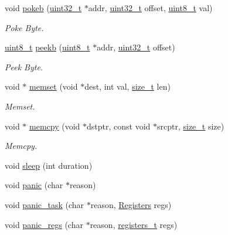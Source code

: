 \begin{DoxyCompactItemize}
\item 
void \hyperlink{a00119_aa291c9926b84df379482632e80ec7c47_aa291c9926b84df379482632e80ec7c47}{pokeb} (\hyperlink{a00125_a435d1572bf3f880d55459d9805097f62_a435d1572bf3f880d55459d9805097f62}{uint32\+\_\+t} $\ast$addr, \hyperlink{a00125_a435d1572bf3f880d55459d9805097f62_a435d1572bf3f880d55459d9805097f62}{uint32\+\_\+t} offset, \hyperlink{a00125_aba7bc1797add20fe3efdf37ced1182c5_aba7bc1797add20fe3efdf37ced1182c5}{uint8\+\_\+t} val)
\begin{DoxyCompactList}\small\item\em Poke Byte. \end{DoxyCompactList}\item 
\hyperlink{a00125_aba7bc1797add20fe3efdf37ced1182c5_aba7bc1797add20fe3efdf37ced1182c5}{uint8\+\_\+t} \hyperlink{a00119_a353956c1fd65c7ed787836534fc9354e_a353956c1fd65c7ed787836534fc9354e}{peekb} (\hyperlink{a00125_aba7bc1797add20fe3efdf37ced1182c5_aba7bc1797add20fe3efdf37ced1182c5}{uint8\+\_\+t} $\ast$addr, \hyperlink{a00125_a435d1572bf3f880d55459d9805097f62_a435d1572bf3f880d55459d9805097f62}{uint32\+\_\+t} offset)
\begin{DoxyCompactList}\small\item\em Peek Byte. \end{DoxyCompactList}\item 
void $\ast$ \hyperlink{a00119_a9e432f267691eceb2e2e0efcc37efbc9_a9e432f267691eceb2e2e0efcc37efbc9}{memset} (void $\ast$dest, int val, \hyperlink{a00125_a29d85914ddff32967d85ada69854206d_a29d85914ddff32967d85ada69854206d}{size\+\_\+t} len)
\begin{DoxyCompactList}\small\item\em Memset. \end{DoxyCompactList}\item 
void $\ast$ \hyperlink{a00119_a370712322c794e949c996946f2283ea8_a370712322c794e949c996946f2283ea8}{memcpy} (void $\ast$dstptr, const void $\ast$srcptr, \hyperlink{a00125_a29d85914ddff32967d85ada69854206d_a29d85914ddff32967d85ada69854206d}{size\+\_\+t} size)
\begin{DoxyCompactList}\small\item\em Memcpy. \end{DoxyCompactList}\item 
void \hyperlink{a00119_afcc76b3d055f3137e37a9c1ce82d0b95_afcc76b3d055f3137e37a9c1ce82d0b95}{sleep} (int duration)
\item 
void \hyperlink{a00119_a5919f9070dd900fd46009a12ce50c2f2_a5919f9070dd900fd46009a12ce50c2f2}{panic} (char $\ast$reason)
\item 
void \hyperlink{a00119_ab8a927fdcddb96915c7f185e2a5db4da_ab8a927fdcddb96915c7f185e2a5db4da}{panic\+\_\+task} (char $\ast$reason, \hyperlink{a00234}{Registers} regs)
\item 
void \hyperlink{a00119_a3f921f0652e48eb9693a597e546081af_a3f921f0652e48eb9693a597e546081af}{panic\+\_\+regs} (char $\ast$reason, \hyperlink{a00104_adf58dbaf6139b4957c348711f2026957_adf58dbaf6139b4957c348711f2026957}{registers\+\_\+t} regs)
\end{DoxyCompactItemize}


